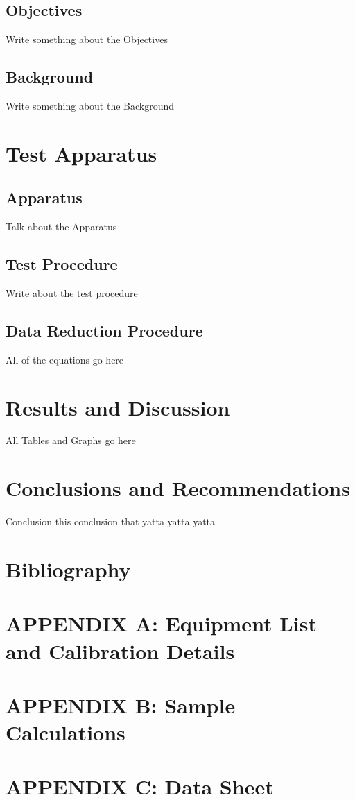 \documentclass{article}
\begin{document}
\subsection{Objectives}
Write something about the Objectives

\subsection{Background}
Write something about the Background


\section{Test Apparatus}
\subsection{Apparatus}
Talk about the Apparatus

\subsection{Test Procedure}
Write about the test procedure

\subsection{Data Reduction Procedure}
All of the equations go here


\section{Results and Discussion}
All Tables and Graphs go here


\section{Conclusions and Recommendations}
Conclusion this conclusion that yatta yatta yatta


\newpage
\section{Bibliography}


\newpage
\section*{APPENDIX A: Equipment List and Calibration Details}

\newpage
\section*{APPENDIX B: Sample Calculations}

\newpage
\section*{APPENDIX C: Data Sheet}
\end{document}
